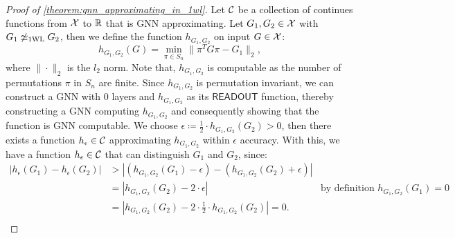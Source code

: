 \begin{proof}[Proof of \autoref{theorem:gnn_approximating_in_1wl}]
    Let $\mathcal{C}$ be a collection of continues functions from $\mathcal{X}$ to $\mathbb{R}$ that is GNN approximating. Let $G_1, G_2 \in \mathcal{X}$ with $G_1 \not\simeq_{\text{1WL}} G_2$, then we define the function $h_{G_1, G_2}$ on input $G \in \mathcal{X}$:
    \begin{equation*}
        h_{G_1, G_2}(G) = \min_{\pi \in S_n} \|\pi^T G \pi - G_1\|_2,
    \end{equation*} where $\|\cdot\|_2$ is the $l_2$ norm. Note that, $h_{G_1, G_2}$ is computable as the number of permutations $\pi$ in $S_n$ are finite. Since $h_{G_1, G_2}$ is permutation invariant, we can construct a GNN with $0$ layers and $h_{G_1, G_2}$ as its $\textsf{READOUT}$ function, thereby constructing a GNN computing $h_{G_1, G_2}$ and consequently showing that the function is GNN computable.
    We choose $\epsilon \coloneqq \frac{1}{2} \cdot h_{G_1, G_2}(G_2) > 0$, then there exists a function $h_\epsilon \in \mathcal{C}$ approximating $h_{G_1, G_2}$ within $\epsilon$ accuracy. With this, we have a function $h_\epsilon \in \mathcal{C}$ that can distinguish $G_1$ and $G_2$, since:
    \begin{align*}
        | h_\epsilon(G_1) - h_\epsilon(G_2)| &> | (h_{G_1, G_2}(G_1) - \epsilon) - (h_{G_1, G_2}(G_2) + \epsilon)|\\
        &= |h_{G_1, G_2}(G_2) -2 \cdot \epsilon| \quad&\text{by definition $h_{G_1, G_2}(G_1) = 0$}\\
        &= |h_{G_1, G_2}(G_2) -2 \cdot \frac{1}{2} \cdot h_{G_1, G_2}(G_2)| = 0.\\
    \end{align*}
\end{proof}


\newpage